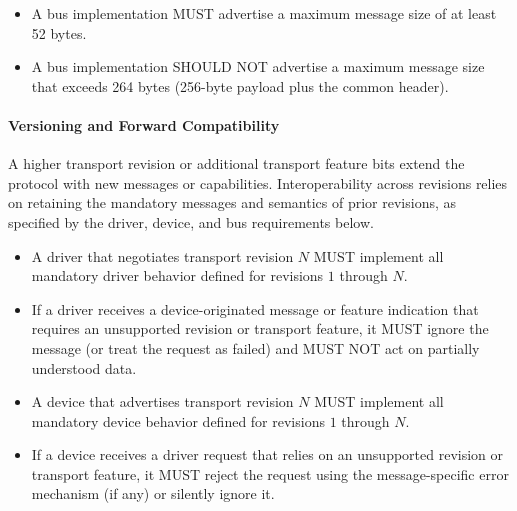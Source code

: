 \begin{itemize}
  \item A bus implementation MUST advertise a maximum message size of at least
        52 bytes.
  \item A bus implementation SHOULD NOT advertise a maximum message size that
        exceeds 264 bytes (256-byte payload plus the common header).
\end{itemize}

\paragraph{Versioning and Forward Compatibility}

A higher transport revision or additional transport feature bits extend the
protocol with new messages or capabilities. Interoperability across revisions
relies on retaining the mandatory messages and semantics of prior revisions,
as specified by the driver, device, and bus requirements below.

\begin{itemize}
  \item A driver that negotiates transport revision $N$ MUST implement all
        mandatory driver behavior defined for revisions $1$ through $N$.
  \item If a driver receives a device-originated message or feature indication
        that requires an unsupported revision or transport feature, it MUST
        ignore the message (or treat the request as failed) and MUST NOT act on
        partially understood data.
\end{itemize}

\begin{itemize}
  \item A device that advertises transport revision $N$ MUST implement all
        mandatory device behavior defined for revisions $1$ through $N$.
  \item If a device receives a driver request that relies on an unsupported
        revision or transport feature, it MUST reject the request using the
        message-specific error mechanism (if any) or silently ignore it.
\end{itemize}

